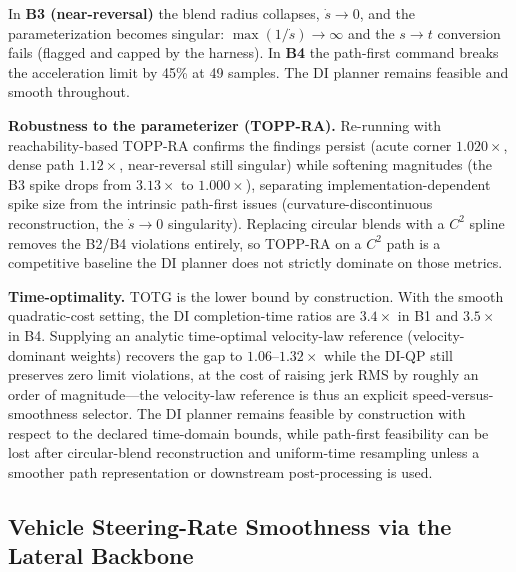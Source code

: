 In \textbf{B3 (near-reversal)} the blend radius collapses,
\(\dot s\to 0\), and the parameterization becomes singular:
\(\max(1/\dot s)\to\infty\) and the \(s\!\to\!t\) conversion fails
(flagged and capped by the harness). In \textbf{B4} the path-first
command breaks the acceleration limit by 45\% at 49 samples. The DI
planner remains feasible and smooth throughout.

\textbf{Robustness to the parameterizer (TOPP-RA).} Re-running with
reachability-based TOPP-RA \cite{toppra} confirms the findings persist
(acute corner \(1.020\times\), dense path \(1.12\times\), near-reversal
still singular) while softening magnitudes (the B3 spike drops from
\(3.13\times\) to \(1.000\times\)), separating implementation-dependent
spike size from the intrinsic path-first issues (curvature-discontinuous
reconstruction, the \(\dot s\to0\) singularity). Replacing circular
blends with a \(C^2\) spline removes the B2/B4 violations entirely, so
TOPP-RA on a \(C^2\) path is a competitive baseline the DI planner does
not strictly dominate on those metrics.

\textbf{Time-optimality.} TOTG is the lower bound by construction. With
the smooth quadratic-cost setting, the DI completion-time ratios are
\(3.4\times\) in B1 and \(3.5\times\) in B4. Supplying an analytic
time-optimal velocity-law reference (velocity-dominant weights) recovers
the gap to \(1.06\)--\(1.32\times\) while the DI-QP still preserves zero
limit violations, at the cost of raising jerk RMS by roughly an order of
magnitude---the velocity-law reference is thus an explicit
speed-versus-smoothness selector. The DI
planner remains feasible by construction with respect to the declared
time-domain bounds, while path-first feasibility can be lost after
circular-blend reconstruction and uniform-time resampling unless a
smoother path representation or downstream post-processing is used.

\subsection{Vehicle Steering-Rate Smoothness via the Lateral
Backbone}\label{c.-autonomous-vehicle-motion-planning-with-the-double-integrator-backbone}

